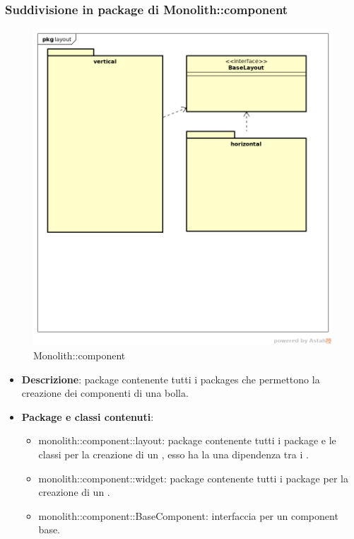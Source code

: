 \subsubsection{Suddivisione in package  di Monolith::component}
\label{Monolith::component}
\begin{figure}[H]
	\centering
	\includegraphics[scale=0.5]{Sezioni/imgPackage/component.png}
	\caption{Monolith::component}
\end{figure}
\begin{itemize}
	\item{\textbf{Descrizione}}: package contenente tutti i packages che permettono la creazione dei componenti di una bolla.
	\item{\textbf{Package e classi contenuti}}:
	\begin{itemize}
	\item{monolith::component::layout}: package contenente tutti i package e le classi per la creazione di un , esso ha la una dipendenza tra i .
	\item{monolith::component::widget}: package contenente tutti i package per la creazione di un .
	\item{monolith::component::BaseComponent}: interfaccia per un component base.
	\end{itemize}

\end{itemize}

